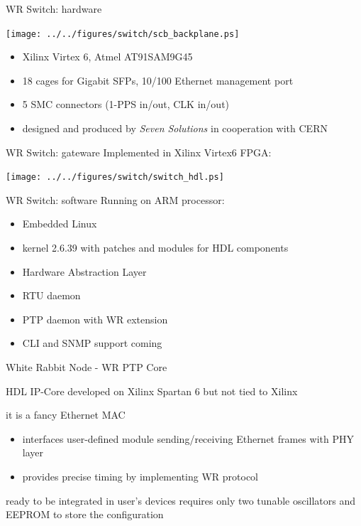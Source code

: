 \documentclass[compress,red]{beamer}
\begin{document}
\begin{frame}{WR Switch: hardware}
	\begin{center}
	\texttt{[image: ../../figures/switch/scb\_backplane.ps]}
	\end{center}
	\begin{itemize}
	\item Xilinx Virtex 6, Atmel AT91SAM9G45
	\item 18 cages for Gigabit SFPs, 10/100 Ethernet management port
	\item 5 SMC connectors (1-PPS in/out, CLK in/out)
	\item designed and produced by \emph{Seven Solutions} in cooperation with CERN
	\end{itemize}
\end{frame}

\begin{frame}{WR Switch: gateware}
	Implemented in Xilinx Virtex6 FPGA:
	\begin{center}
	\texttt{[image: ../../figures/switch/switch\_hdl.ps]}
	\end{center}
\end{frame}

\begin{frame}{WR Switch: software}
	Running on ARM processor:
	\begin{itemize}
	\item Embedded Linux
	\item kernel 2.6.39 with patches and modules for HDL components
	\item Hardware Abstraction Layer
	\item RTU daemon
	\item PTP daemon with WR extension
	\item CLI and SNMP support coming
	\end{itemize}
\end{frame}

\begin{frame}{White Rabbit Node - WR PTP Core}
	\begin{block}{HDL IP-Core}
	developed on Xilinx Spartan 6 but not tied to Xilinx
	\end{block}
	\begin{block}{it is a fancy Ethernet MAC}
	\begin{itemize}
	\item interfaces user-defined module sending/receiving Ethernet frames with PHY layer
	\item provides precise timing by implementing WR protocol
	\end{itemize}
	\end{block}
	\begin{block}{ready to be integrated in user's devices}
	requires only two tunable oscillators and EEPROM to store the configuration
	\end{block}
\end{frame}
\end{document}
